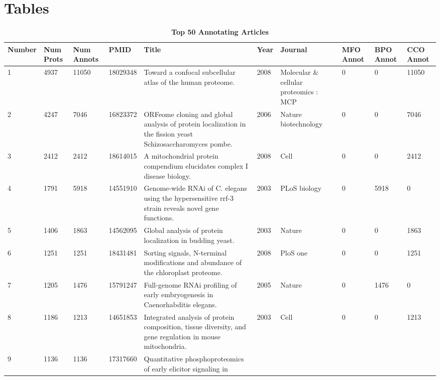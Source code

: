 \documentclass[12pt]{article}
\begin{document}
\section*{Tables}

\begin{table}[!ht]
\caption{
\bf{Top 50 Annotating Articles}}
\begin{tabular}{|l|l|l|l|l|l|l|l|l|l|}
\hline
Number & Num Prots & Num Annots & PMID & Title & Year & Journal & MFO Annot & BPO Annot & CCO Annot \\ \hline
1 & 4937 & 11050 & 18029348 & Toward a confocal subcellular atlas of the human proteome. & 2008 &
Molecular \& cellular proteomics : MCP & 0 & 0 & 11050 \\ \hline
2 & 4247 & 7046 & 16823372 & ORFeome cloning and global analysis of protein localization in the fission yeast Schizosaccharomyces pombe. & 2006 & Nature biotechnology & 0 & 0 & 7046 \\ \hline
3 & 2412 & 2412 & 18614015 & A mitochondrial protein compendium elucidates complex I disease biology. & 2008 & Cell & 0 & 0 & 2412 \\ \hline
4 & 1791 & 5918 & 14551910 & Genome-wide RNAi of C. elegans using the hypersensitive rrf-3 strain reveals novel gene functions. & 2003 & PLoS biology & 0 & 5918 & 0 \\ \hline
5 & 1406 & 1863 & 14562095 & Global analysis of protein localization in budding yeast. & 2003 & Nature & 0 & 0 & 1863 \\ \hline
6 & 1251 & 1251 & 18431481 & Sorting signals, N-terminal modifications and abundance of the chloroplast proteome. & 2008 & PloS one & 0 & 0 & 1251 \\ \hline
7 & 1205 & 1476 & 15791247 & Full-genome RNAi profiling of early embryogenesis in Caenorhabditis elegans. & 2005 & Nature & 0 & 1476 & 0 \\ \hline
8 & 1186 & 1213 & 14651853 & Integrated analysis of protein composition, tissue diversity, and gene regulation in mouse mitochondria. & 2003 & Cell & 0 & 0 & 1213 \\ \hline
9 & 1136 & 1136 & 17317660 & Quantitative phosphoproteomics of early elicitor signaling in

\end{tabular}
\end{table}
\end{document}
